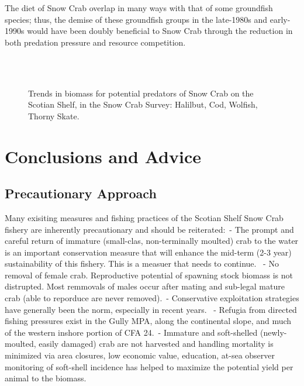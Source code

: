\documentclass[paper=a4, fontsize=11pt]{article}
\newcommand{\D}{.}
\newcommand{\e}{/home/michelle/ecomod_data/}
\newcommand{\es}{snowcrab/}
\newcommand{\Ay}{assessments/2015/}
\begin{document}
The diet of Snow Crab overlap in many ways with that of some groundfish species; thus, the demise of these groundfish groups in the late-1980s and early-1990s would have been doubly beneficial to Snow Crab through the reduction in both predation pressure and resource competition. 

\begin{figure}[h]
    \centering
    \   
    \\
    \subfloat{\texttt{[image: \\e \\es \\Ay timeseries/survey/ms\\D mass\\D 50.png]}}\
    \\

    \caption{Trends in biomass for potential predators of Snow Crab on the Scotian Shelf, in the Snow Crab Survey: Halilbut, Cod, Wolfish, Thorny Skate.}
\end{figure}
\clearpage

\section{Conclusions and Advice}
\subsection{Precautionary Approach}
Many exisiting measures and fishing practices of the Scotian Shelf Snow Crab fishery are inherently precautionary and should be reiterated:\
- The prompt and careful return of immature (small-clas, non-terminally moulted) crab to the water is an important conservation measure that will enhance the mid-term (2-3 year) sustainability of this fishery. This is a measuer that needs to continue. \
- No removal of female crab. Reproductive potential of spawning stock biomass is not distrupted. Most remmovals of males occur after mating and sub-legal mature crab (able to reporduce are never removed).\
- Conservative exploitation strategies have generally been the norm, especially in recent years. \
- Refugia from directed fishing pressures exist in the Gully MPA, along the continental slope, and much of the western inshore portion of CFA 24.\
- Immature and soft-shelled (newly-moulted, easily damaged) crab are not harvested and handling mortality is minimized via area closures, low economic value, education, at-sea observer monitoring of soft-shell incidence has helped to maximize the potential yield per animal to the biomass. \\
\end{document}
